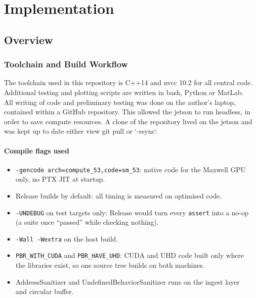 \chapter{Implementation}
\label{ch:implementation}

\section{Overview}
\label{sec:ch4.overview}

\subsection{Toolchain and Build Workflow}
\label{subsec:ch4.overview.toolchain}

The toolchain used in this repository is C++14 and nvcc 10.2 for all central code. Additional testing and plotting scripts are written in bash, Python or MatLab.
All writing of code and preliminary testing was done on the author's laptop, contained within a GitHub repository. This allowed the jetson to run headless, in order to save compute resources. A clone of the repository lived on the jetson and was kept up to date either view git pull or `-rsync`. 

\subsubsection{Compile flags used}

\begin{itemize}
        \item \texttt{-gencode arch=compute\_53,code=sm\_53}: native code for the Maxwell GPU only, no PTX JIT at startup.
        \item Release builds by default: all timing is measured on optimised code.
        \item \texttt{-UNDEBUG} on test targets only: Release would turn every \texttt{assert} into a no-op (a suite once ``passed'' while checking nothing).
        \item \texttt{-Wall -Wextra} on the host build.
        \item \texttt{PBR\_WITH\_CUDA} and \texttt{PBR\_HAVE\_UHD}: CUDA and UHD code built only where the libraries exist, so one source tree builds on both machines.
        \item AddressSanitizer and UndefinedBehaviorSanitizer runs on the ingest layer and circular buffer.
\end{itemize}


